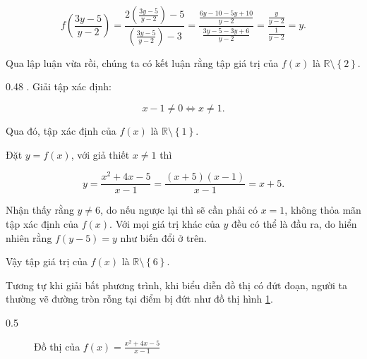 \begin{equation*}
   f\left(\frac{3y - 5}{y - 2}\right) = \frac{2\left(\frac{3y - 5}{y - 2}\right) - 5}{\left(\frac{3y - 5}{y - 2}\right) - 3} = \frac{\frac{6y - 10 - 5y + 10}{y - 2}}{\frac{3y - 5 - 3y + 6}{y - 2}} = \frac{\frac{y}{y - 2}}{\frac{1}{y - 2}} = y.
\end{equation*}

Qua lập luận vừa rồi, chúng ta có kết luận rằng tập giá trị của $f(x)$ là $\mathbb{R} \setminus \left\{2\right\}$.

{
   \begin{minipageindent}{0.48\textwidth}
. Giải tập xác định:
      
      $$x - 1 \neq 0 \iff x \neq 1.$$
      
      Qua đó, tập xác định của $f(x)$ là $\mathbb{R} \setminus \left\{1\right\}$.
      
      Đặt $y = f(x)$, với giả thiết $x \neq 1$ thì 
      
      $$
      y = \frac{x^2 + 4x - 5}{x - 1} = \frac{(x + 5)(x - 1)}{x - 1} = x + 5.
      $$
      
      Nhận thấy rằng $y\neq 6$, do nếu ngược lại thì sẽ cần phải có $x = 1$, không thỏa mãn tập xác định của $f(x)$. Với mọi giá trị khác của $y$ đều có thể là đầu ra, do hiển nhiên rằng $f(y - 5) = y$ như biến đổi ở trên.
      
      Vậy tập giá trị của $f(x)$ là $\mathbb{R} \setminus \left\{6\right\}$.

      Tương tự khi giải bất phương trình, khi biểu diễn đồ thị có đứt đoạn, người ta thường vẽ đường tròn rỗng tại điểm bị đứt như đồ thị hình \ref{fig:ham_so_mot_bien:phan_thuc:145_1t1}.
   \end{minipageindent}
   \hfill
   \begin{minipageindent}{0.5\textwidth}
      \begin{figure}[H]
         \centering
         \caption{Đồ thị của $f(x) = \frac{x^{2} + 4 x - 5}{x - 1}$}
         \label{fig:ham_so_mot_bien:phan_thuc:145_1t1}
      \end{figure}
   \end{minipageindent}
}

